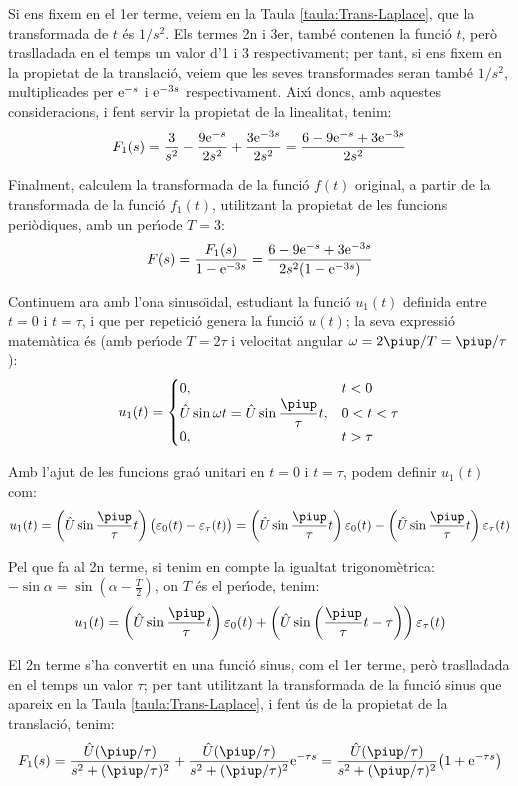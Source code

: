 \begin{exemple}
Si ens fixem en el 1er terme, veiem en la Taula
\vref{taula:Trans-Laplace}, que la  transformada de $t$ \'{e}s $1/s^2$.
Els termes 2n i 3er, tamb\'{e} contenen la funci\'{o} $t$, per\`{o} traslladada
en el temps un valor d'1 i 3 respectivament; per tant, si ens fixem
en la propietat de la translaci\'{o}, veiem que les seves transformades
seran tamb\'{e} $1/s^2$, multiplicades per $\mathrm{e}^{-s}$ i $\mathrm{e}^{-3s}$
respectivament. Aix\'{\i} doncs, amb aquestes consideracions, i fent
servir la propietat de la linealitat, tenim:
\[
    F_1(s) = \frac{3}{s^2} - \frac{9 \mathrm{e}^{-s}}{2 s^2} + \frac{3 \mathrm{e}^{-3s}}{2
    s^2} =\frac{6-9\mathrm{e}^{-s}+3\mathrm{e}^{-3s}}{2s^2}
\]

Finalment, calculem la transformada de la funci\'{o} $f(t)$ original, a
partir de la transformada de la funci\'{o} $f_1(t)$, utilitzant la
propietat de les funcions peri\`{o}diques, amb un per\'{\i}ode $T=3$:
\[
    F(s) = \frac{F_1(s)}{1-\mathrm{e}^{-3s}} = \frac{6-9\mathrm{e}^{-s}+3\mathrm{e}^{-3s}}{2s^2(1-\mathrm{e}^{-3s}) }
\]

Continuem ara  amb l'ona sinuso\"{\i}dal, estudiant la funci\'{o} $u_1(t)$
definida entre $t=0$ i $t=\tau$, i que per repetici\'{o} genera la
funci\'{o} $u(t)$; la seva expressi\'{o} matem\`{a}tica \'{e}s (amb per\'{\i}ode $T=
2\tau$ i velocitat angular $\omega= 2\piup/T  = \piup/\tau$):
\[
    u_1(t) = \begin{cases} 0, & t < 0\\ \hat{U}\sin\omega t =
    \hat{U}\sin\dfrac{\piup}{\tau}t,  & 0<t<\tau \\ 0, & t > \tau \end{cases}
\]


Amb l'ajut de les funcions gra\'{o} unitari en $t=0$ i $t=\tau$, podem
definir $u_1(t)$ com:
\[
    u_1(t)=\left(\hat{U}\sin\frac{\piup}{\tau}t\right)\bigl(\varepsilon_0(t)-\varepsilon_\tau(t)\bigr)
    =\left(\hat{U}\sin\frac{\piup}{\tau}t\right)\varepsilon_0(t) - \left(\hat{U}\sin\frac{\piup}{\tau}t\right)\varepsilon_\tau(t)
\]

Pel que fa al 2n  terme, si tenim en compte la igualtat
trigonom\`{e}trica: $-\sin \alpha = \sin(\alpha-\frac{T}{2})$, on $T$ \'{e}s
el per\'{\i}ode, tenim:
\[
    u_1(t) = \left(\hat{U}\sin\frac{\piup}{\tau}t\right)\varepsilon_0(t) +
    \left(\hat{U}\sin\left(\frac{\piup}{\tau}t-\tau\right)\right)\varepsilon_\tau(t)
\]

El 2n terme s'ha convertit en una funci\'{o} sinus, com el 1er terme,
per\`{o} traslladada en el temps un valor $\tau$; per tant utilitzant la
transformada de la funci\'{o} sinus que apareix en la Taula
\vref{taula:Trans-Laplace}, i fent \'{u}s de la propietat de la
translaci\'{o}, tenim:
\[
    F_1(s) = \frac{\hat{U} (\piup/\tau)}{s^2 + (\piup/\tau)^2} +
    \frac{\hat{U} (\piup/\tau)}{s^2 + (\piup/\tau)^2} \eu^{-\tau s} =
    \frac{\hat{U} (\piup/\tau)}{s^2 + (\piup/\tau)^2} \bigl( 1+\eu^{-\tau s}
    \big)
\]


\end{exemple}

